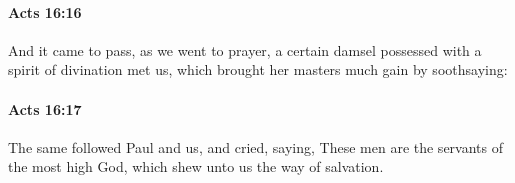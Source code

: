		\paragraph{Acts 16:16} %
			\label{ACTS-16-16}

			And it came to pass, as we went to prayer, a certain damsel possessed with a spirit of divination met us, which brought her masters much gain by soothsaying:

			\begin{framed}
			\scriptsize
				\begin{compactdesc}
					\item[SBLG] 
				\end{compactdesc}
			\end{framed}

		\paragraph{Acts 16:17} %
			\label{ACTS-16-17}

			The same followed Paul and us, and cried, saying, These men are the servants of the most high God, which shew unto us the way of salvation.


